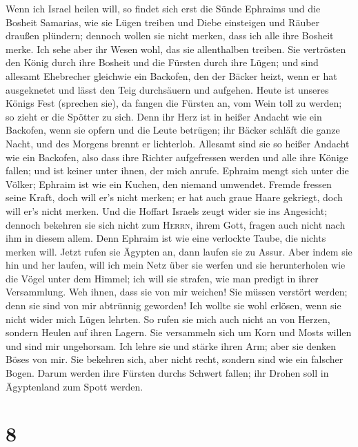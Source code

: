  Wenn ich Israel heilen will, so findet sich erst die
Sünde Ephraims und die Bosheit Samarias, wie sie Lügen treiben und Diebe
einsteigen und Räuber draußen plündern;  dennoch wollen
sie nicht merken, dass ich alle ihre Bosheit merke. Ich sehe aber ihr
Wesen wohl, das sie allenthalben treiben.  Sie vertrösten
den König durch ihre Bosheit und die Fürsten durch ihre Lügen;
 und sind allesamt Ehebrecher gleichwie ein Backofen, den
der Bäcker heizt, wenn er hat ausgeknetet und lässt den Teig durchsäuern
und aufgehen.  Heute ist unseres Königs Fest (sprechen
sie), da fangen die Fürsten an, vom Wein toll zu werden; so zieht er die
Spötter zu sich.  Denn ihr Herz ist in heißer Andacht wie
ein Backofen, wenn sie opfern und die Leute betrügen; ihr Bäcker schläft
die ganze Nacht, und des Morgens brennt er lichterloh. 
Allesamt sind sie so heißer Andacht wie ein Backofen, also dass ihre
Richter aufgefressen werden und alle ihre Könige fallen; und ist keiner
unter ihnen, der mich anrufe.  Ephraim mengt sich unter
die Völker; Ephraim ist wie ein Kuchen, den niemand umwendet.
 Fremde fressen seine Kraft, doch will er's nicht merken;
er hat auch graue Haare gekriegt, doch will er's nicht merken.
 Und die Hoffart Israels zeugt wider sie ins Angesicht;
dennoch bekehren sie sich nicht zum \textsc{Herrn}, ihrem Gott, fragen
auch nicht nach ihm in diesem allem.  Denn Ephraim ist
wie eine verlockte Taube, die nichts merken will. Jetzt rufen sie
Ägypten an, dann laufen sie zu Assur.  Aber indem sie hin
und her laufen, will ich mein Netz über sie werfen und sie herunterholen
wie die Vögel unter dem Himmel; ich will sie strafen, wie man predigt in
ihrer Versammlung.  Weh ihnen, dass sie von mir weichen!
Sie müssen verstört werden; denn sie sind von mir abtrünnig geworden!
Ich wollte sie wohl erlösen, wenn sie nicht wider mich Lügen lehrten.
 So rufen sie mich auch nicht an von Herzen, sondern
Heulen auf ihren Lagern. Sie versammeln sich um Korn und Mosts willen
und sind mir ungehorsam.  Ich lehre sie und stärke ihren
Arm; aber sie denken Böses von mir.  Sie bekehren sich,
aber nicht recht, sondern sind wie ein falscher Bogen. Darum werden ihre
Fürsten durchs Schwert fallen; ihr Drohen soll in Ägyptenland zum Spott
werden.

\hypertarget{section-7}{%
\section{8}\label{section-7}}

